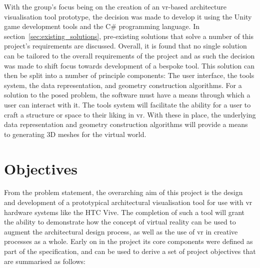     With the group's focus being on the creation of an \acrshort{vr}-based architecture visualisation tool prototype, the decision was made to develop it using the Unity game development tools and the C\# programming language. In section~\ref{sec:existing_solutions}, pre-existing solutions that solve a number of this project's requirements are discussed. Overall, it is found that no single solution can be tailored to the overall requirements of the project and as such the decision was made to shift focus towards development of a bespoke tool. This solution can then be split into a number of principle components: The user interface, the tools system, the data representation, and geometry construction algorithms. For a solution to the posed problem, the software must have a means through which a user can interact with it. The tools system will facilitate the ability for a user to craft a structure or space to their liking in \acrshort{vr}. With these in place, the underlying data representation and geometry construction algorithms will provide a means to generating 3D meshes for the virtual world.

\section{Objectives}

    From the problem statement, the overarching aim of this project is the design and development of a prototypical architectural visualisation tool for use with \acrshort{vr} hardware systems like the HTC Vive. The completion of such a tool will grant the ability to demonstrate how the concept of virtual reality can be used to augment the architectural design process, as well as the use of \acrshort{vr} in creative processes as a whole. Early on in the project its core components were defined as part of the specification, and can be used to derive a set of project objectives that are summarised as follows:
    
